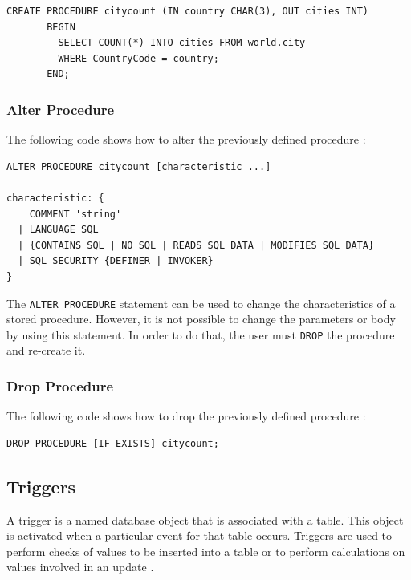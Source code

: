\documentclass[12pt]{article}
\begin{document}
\begin{verbatim}
CREATE PROCEDURE citycount (IN country CHAR(3), OUT cities INT)
       BEGIN
         SELECT COUNT(*) INTO cities FROM world.city
         WHERE CountryCode = country;
       END;
\end{verbatim}


\subsubsection{Alter Procedure}
\label{alterProcedure}
The following code shows how to alter the previously defined procedure \parencite{alterProcedure}:

\begin{verbatim}
ALTER PROCEDURE citycount [characteristic ...]

characteristic: {
    COMMENT 'string'
  | LANGUAGE SQL
  | {CONTAINS SQL | NO SQL | READS SQL DATA | MODIFIES SQL DATA}
  | SQL SECURITY {DEFINER | INVOKER}
}
\end{verbatim}

\noindent The \verb|ALTER PROCEDURE| statement can be used to change the characteristics of a stored procedure. However, it is not possible to change the parameters or body by using this statement. In order to do that, the user must \verb|DROP| the procedure and re-create it.


\subsubsection{Drop Procedure}
\label{alterProcedure}
The following code shows how to drop the previously defined procedure \parencite{dropProcedure}:

\begin{verbatim}
DROP PROCEDURE [IF EXISTS] citycount;

\end{verbatim}



\subsection{Triggers}
\label{triggers}
A trigger is a named database object that is associated with a table. This object is activated when a particular event for that table occurs. Triggers are used to perform checks of values to be inserted into a table or to perform calculations on values involved in an update \parencite{TriggersDef}.

\vspace{0.3cm}
\end{document}
